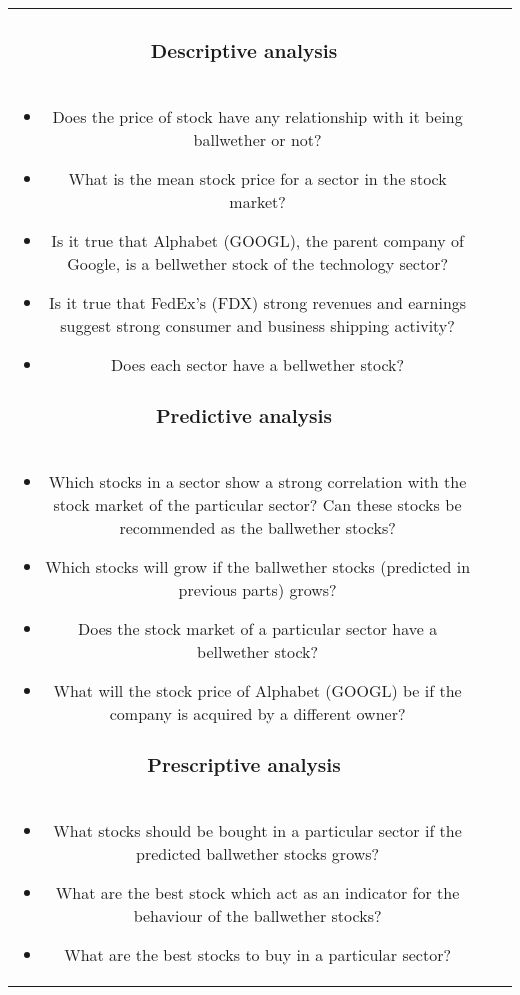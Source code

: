 \documentclass[12pt]{article}
\begin{document}
\begin{center}
\begin{tabular}{ |c|c|c|}
    \subsubsection*{Descriptive analysis}\\
    \begin{itemize}
        \item Does the price of stock have any relationship with it being ballwether or not?
        \item What is the mean stock price for a sector in the stock market?
        \item Is it true that Alphabet (GOOGL), the parent company of Google, is a bellwether stock of the technology sector?
        \item Is it true that FedEx's (FDX) strong revenues and earnings suggest strong consumer and business shipping activity?
        \item Does each sector have a bellwether stock?
    \end{itemize}

    \subsubsection*{Predictive analysis}\\
    \begin{itemize}
        \item Which stocks in a sector show a strong correlation with the stock market of the particular sector? Can these stocks be recommended as the ballwether stocks?
        \item Which stocks will grow if the ballwether stocks (predicted in previous parts) grows?
        \item Does the stock market of a particular sector have a bellwether stock? 
        \item What will the stock price of Alphabet (GOOGL) be if the company is acquired by a different owner?
    \end{itemize}
    
    \subsubsection*{Prescriptive analysis}\\
    \begin{itemize}
        \item What stocks should be bought in a particular sector if the predicted ballwether stocks grows?
        \item What are the best stock which act as an indicator for the behaviour of the ballwether stocks?
        \item What are the best stocks to buy in a particular sector?
    \end{itemize}
    

\end{tabular}
\end{center}
\end{document}
